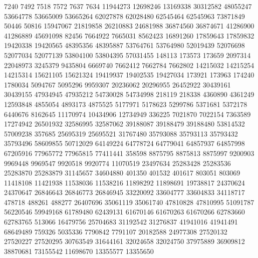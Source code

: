 7240
7492
7518
7572
7637
7634
11944273
12698246
13169338
30312582
48055247
53664778
53665009
53665264
62027878
62028480
62545464
62545963
73871849
50446
50816
15947067
21819858
26210883
24681988
36874560
36874671
41286900
41286889
45691098
82456
7664922
7665031
8562423
16891260
17859643
17859832
19420338
19420565
48395356
48395887
53764761
53764980
52019439
52076698
52077034
52077139
53804100
53804395
57031455
148113
173573
173659
2097314
22048973
3245379
9435804
6669740
7662412
7662784
7662802
14215032
14215254
14215314
15621105
15621324
19419937
19402535
19427034
173921
173963
174240
1780034
5094767
5095296
9959307
20236062
20296955
26452922
30439161
30439155
47934945
47935212
54730028
54734998
218119
218338
4360890
4361249
12593848
4855054
4893173
4875525
5177971
5178623
5299786
5371681
5372178
6440676
8162645
11170974
10434906
12734949
336225
7021870
7022154
7363589
17274942
26501932
32586995
32587062
39188087
39188479
39188480
53814532
57009238
357685
25695319
25695521
31767480
35793088
35793113
35793432
35793496
58609855
50712029
64149224
64778724
64779041
64857937
64857998
67205916
77965772
77965815
77411441
358598
8875795
8875813
8875997
9200903
9969448
9969547
9920518
9920774
11070519
23497634
25283428
25283536
25283870
25283879
31145657
34604880
401350
401532
401617
803051
803069
11418108
11421938
11538036
11538216
11898292
11898691
19738817
24370624
24370647
26846643
26846773
26846945
33220092
33604777
33604833
34118717
478718
488261
488277
26407696
35061119
35061740
47810828
47810995
51091787
56220546
59949168
61789480
62439131
61670146
61670263
61670266
62783660
62783765
513066
16479756
25704683
31192542
31276837
41941016
41941491
68649489
759326
5035336
7790842
7791107
20182588
24977308
27520132
27520227
27520295
30763549
31644161
32024658
32024750
37975889
36909812
38870681
73155542
11698670
13355577
13355650


